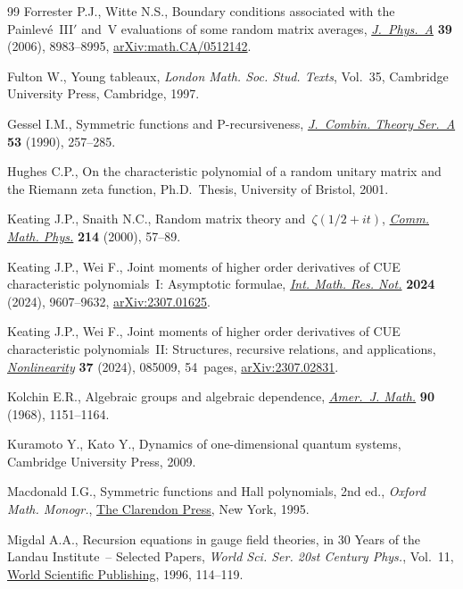 \documentclass[pdftex]{sigma}
\numberwithin{equation}{section}
\theoremstyle{definition}
\begin{document}
\begin{thebibliography}{99}
Forrester P.J., Witte N.S., Boundary conditions associated with the
 {P}ainlev\'e~{III{$'$}} and~{V} evaluations of some random matrix averages,
 \href{https://doi.org/10.1088/0305-4470/39/28/S13}{\textit{J.~Phys.~A}}
 \textbf{39} (2006), 8983--8995,
 \href{http://arxiv.org/abs/math.CA/0512142}{arXiv:math.CA/0512142}.

Fulton W., Young tableaux, \textit{London Math. Soc. Stud. Texts}, Vol.~35,
 Cambridge University Press, Cambridge, 1997.

Gessel I.M., Symmetric functions and {P}-recursiveness,
 \href{https://doi.org/10.1016/0097-3165(90)90060-A}{\textit{J.~Combin. Theory
 Ser.~A}} \textbf{53} (1990), 257--285.

Hughes C.P., On the characteristic polynomial of a random unitary matrix and
 the {R}iemann zeta function, Ph.D.~Thesis, {U}niversity of Bristol, 2001.

Keating J.P., Snaith N.C., Random matrix theory and~{$\zeta(1/2+it)$},
 \href{https://doi.org/10.1007/s002200000261}{\textit{Comm. Math. Phys.}}
 \textbf{214} (2000), 57--89.

Keating J.P., Wei F., Joint moments of higher order derivatives of {CUE}
 characteristic polynomials~{I}: {A}symptotic formulae,
 \href{https://doi.org/10.1093/imrn/rnae063}{\textit{Int. Math. Res. Not.}}
 \textbf{2024} (2024), 9607--9632,
 \href{http://arxiv.org/abs/2307.01625}{arXiv:2307.01625}.

Keating J.P., Wei F., Joint moments of higher order derivatives of {CUE}
 characteristic polynomials~{II}: {S}tructures, recursive relations, and
 applications,
 \href{https://doi.org/10.1088/1361-6544/ad5948}{\textit{Nonlinearity}}
 \textbf{37} (2024), 085009, 54~pages,
 \href{http://arxiv.org/abs/2307.02831}{arXiv:2307.02831}.

Kolchin E.R., Algebraic groups and algebraic dependence,
 \href{https://doi.org/10.2307/2373294}{\textit{Amer.~J. Math.}} \textbf{90}
 (1968), 1151--1164.

Kuramoto Y., Kato Y., Dynamics of one-dimensional quantum systems, Cambridge
 University Press, 2009.

Macdonald I.G., Symmetric functions and {H}all polynomials, 2nd ed., \textit{Oxford
 Math. Monogr.}, \href{https://doi.org/10.1093/oso/9780198534891.001.0001}{The
 Clarendon Press}, New York, 1995.

Migdal A.A., Recursion equations in gauge field theories, in 30 {Y}ears of the
 {L}andau {I}nstitute~-- {S}elected {P}apers, \textit{World Sci. Ser. 20st
 Century Phys.}, Vol.~11,
 \href{https://doi.org/10.1142/9789814317344_0017}{World Scientific
 Publishing}, 1996, 114--119.


\end{thebibliography}
\end{document}
